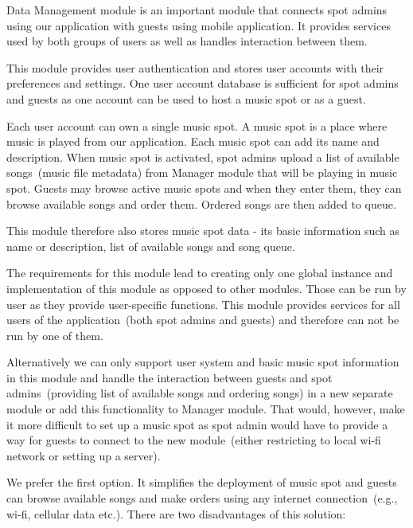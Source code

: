 Data Management module is an important module that connects spot admins using our application with guests using mobile application. It provides services used by both groups of users as well as handles interaction between them.
\par
This module provides user authentication and stores user accounts with their preferences and settings. One user account database is sufficient for spot admins and guests as one account can be used to host a music spot or as a guest.
\par
Each user account can own a single music spot. A music spot is a place where music is played from our application. Each music spot can add its name and description. When music spot is activated, spot admins upload a list of available songs~(music file metadata) from Manager module that will be playing in music spot. Guests may browse active music spots and when they enter them, they can browse available songs and order them. Ordered songs are then added to queue.
\par
This module therefore also stores music spot data - its basic information such as name or description, list of available songs and song queue.
\par
The requirements for this module lead to creating only one global instance and implementation of this module as opposed to other modules. Those can be run by user as they provide user-specific functions. This module provides services for all users of the application~(both spot admins and guests) and therefore can not be run by one of them.
\par
Alternatively we can only support user system and basic music spot information in this module and handle the interaction between guests and spot admins~(providing list of available songs and ordering songs) in a new separate module or add this functionality to Manager module. That would, however, make it more difficult to set up a music spot as spot admin would have to provide a way for guests to connect to the new module~(either restricting to local wi-fi network or setting up a server).
\par
We prefer the first option. It simplifies the deployment of music spot and guests can browse available songs and make orders using any internet connection~(e.g., wi-fi, cellular data etc.). There are two disadvantages of this solution:
